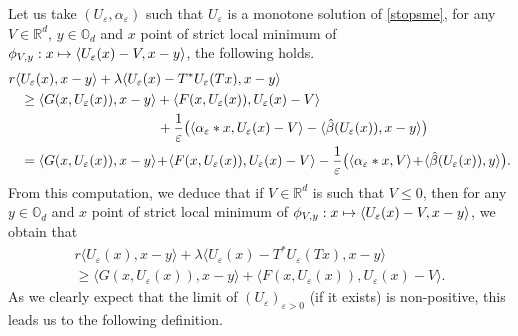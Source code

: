 \documentclass[10pt]{amsart}
\newcommand\mto{\mathchoice{\longmapsto}{\mapsto}{\mapsto}{\mapsto}}
\let\epsilon\varepsilon
\theoremstyle{definition}
\begin{document}
Let us take $(U_{\epsilon},\alpha_{\epsilon})$ such that $U_{\epsilon}$ is a monotone solution of \eqref{stopsme}, for any $V \in \mathbb{R}^d$, $y \in \mathbb{O}_d$ and $x$ point of strict local minimum of $\phi_{V,y}: x \mto \langle U_{\epsilon}(x)-V, x-y\rangle$, the following holds.
\begin{equation*}
\begin{aligned}
r \langle &U_{\epsilon} (x), x-y \rangle+\lambda \langle U_{\epsilon}(x)-T^*U_{\epsilon}(Tx),x-y\rangle\\
&\geq\langle G(x,U_{\epsilon}(x)), x- y \rangle+\langle F(x,U_{\epsilon}(x)), U_{\epsilon}(x)-V \rangle\\
&\hspace*{3.5cm}+ \frac{1}{\epsilon}\bigl(\langle \alpha_{\epsilon}*x, U_{\epsilon}(x)-V\rangle-\langle \hat{\beta}(U_{\epsilon}(x)), x-y \rangle \bigr)\\
&= \langle G(x,U_{\epsilon}(x)), x- y \rangle\!+\!\langle F(x,U_{\epsilon}(x)), U_{\epsilon}(x)-V \rangle- \frac{1}{\epsilon}\bigl(\langle \alpha_{\epsilon}*x, V\rangle\!+\!\langle \hat{\beta}(U_{\epsilon}(x)), y \rangle \bigr).
\end{aligned}
\end{equation*}
From this computation, we deduce that if $V \in \mathbb{R}^d$ is such that $V \leq 0$, then for any $y \in \mathbb{O}_d$ and $x$ point of strict local minimum of $\phi_{V,y}: x \mto \langle U_{\epsilon}(x)-V, x-y\rangle$, we obtain that
\begin{multline}\label{remstop}
r \langle U_{\epsilon} (x), x-y \rangle+\lambda \langle U_{\epsilon}(x)-T^*U_{\epsilon}(Tx),x-y\rangle \\
\geq
\langle G(x,U_{\epsilon}(x)), x- y \rangle+\langle F(x,U_{\epsilon}(x)), U_{\epsilon}(x)-V \rangle.
\end{multline}
As we clearly expect that the limit of $(U_{\epsilon})_{\epsilon> 0} $ (if it exists) is non-positive, this leads us to the following definition.
\end{document}

